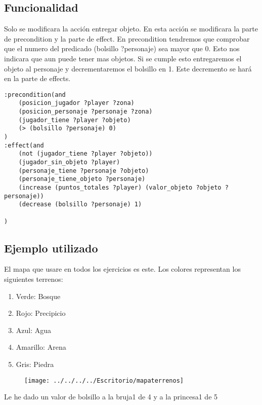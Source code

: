 \documentclass[]{article}
\begin{document}
\subsection{Funcionalidad}
	Solo se modificara la acción entregar objeto. En esta acción se modificara la parte de precondition y la parte de effect. 
	En precondition tendremos que comprobar que el numero del predicado (bolsillo ?personaje) sea mayor que 0. Esto nos indicara que aun puede tener mas objetos. Si se cumple esto entregaremos el objeto al personaje y decrementaremos el bolsillo en 1. Este decremento se hará en la parte de effects.
	\begin{lstlisting}
:precondition(and
	(posicion_jugador ?player ?zona)
	(posicion_personaje ?personaje ?zona)
	(jugador_tiene ?player ?objeto)
	(> (bolsillo ?personaje) 0)
)
:effect(and 
	(not (jugador_tiene ?player ?objeto))
	(jugador_sin_objeto ?player)
	(personaje_tiene ?personaje ?objeto)
	(personaje_tiene_objeto ?personaje)
	(increase (puntos_totales ?player) (valor_objeto ?objeto ?personaje))
	(decrease (bolsillo ?personaje) 1)
	
)
	\end{lstlisting}


\subsection{Ejemplo utilizado}
El mapa que usare en todos los ejercicios es este. Los colores representan los siguientes terrenos:
\begin{enumerate}
	\item{Verde:} Bosque
	\item{Rojo:} Precipicio
	\item{Azul:} Agua
	\item{Amarillo:} Arena
	\item{Gris:} Piedra
\end{enumerate}

\begin{figure}[H]
	\centering
	\texttt{[image: ../../../../Escritorio/mapaterrenos]}
\end{figure}

Le he dado un valor de bolsillo a la bruja1 de 4 y a la princesa1 de 5
\end{document}
